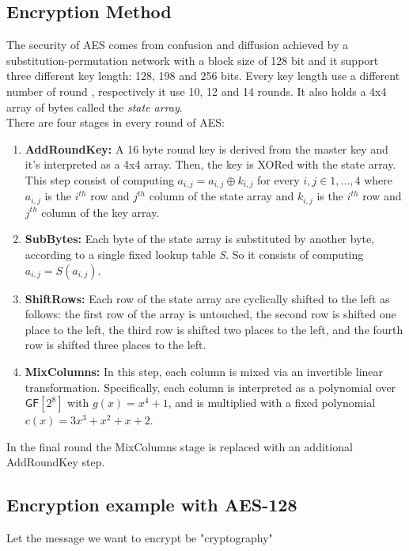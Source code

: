 \subsection{Encryption Method}
The security of AES comes from confusion and diffusion achieved by a substitution-permutation network with a block size of 128 bit and it support three different key length: 128, 198 and 256 bits. Every key length use a different number of round , respectively it use 10, 12 and 14 rounds. It also holds a 4x4 array of bytes called the \emph{state array}.\\
There are four stages in every round of AES:
\begin{enumerate}
    \item{\textbf{AddRoundKey:} A 16 byte round key is derived from the master key and it's interpreted as a 4x4 array. Then, the key is XORed with the state array.\\This step consist of computing $a_{i,j} = a_{i,j} \oplus k_{i,j}$ for every $i,j \in {1,...,4}$ where $a_{i,j}$ is the $i^{th}$ row and $j^{th}$ column of the state array and $k_{i,j}$ is the $i^{th}$ row and $j^{th}$ column of the key array.}
    \item{\textbf{SubBytes:} Each byte of the state array is substituted by another byte, according to a single fixed lookup table \emph{S}. So it consists of computing $a_{i,j} = S(a_{i,j})$.}
    \item{\textbf{ShiftRows:} Each row of the state array are cyclically shifted to the left as follows: the first row of the array is untouched, the second row is shifted one place to the left, the third row is shifted two places to the left, and the fourth row is shifted three places to the left.}
    \item{\textbf{MixColumns:} In this step, each column is mixed via an invertible linear transformation. Specifically, each column is interpreted as a polynomial over $\mathsf{GF}[2^8]$ with $g(x) = x^4 + 1$, and is multiplied with a fixed polynomial $c(x) = 3x^3 + x^2 + x + 2$.}
\end{enumerate}
In the final round the MixColumns stage is replaced with an additional AddRoundKey step.\\

\subsection{Encryption example with AES-128}
Let the message we want to encrypt be "cryptography"
